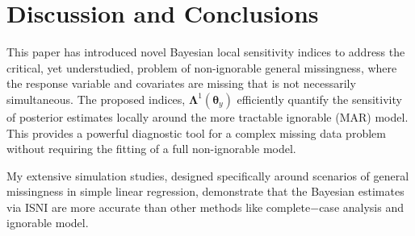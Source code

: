 \documentclass[twoside]{article}
\begin{document}
\section{Discussion  and Conclusions}
This paper has introduced novel Bayesian local sensitivity indices to address
the critical, yet understudied, problem of non-ignorable general missingness,
where the response variable and  covariates are missing that is not necessarily simultaneous.
 The proposed  indices, $\pmb\Lambda^{1}(\pmb\theta _y)$  efficiently quantify the sensitivity of posterior estimates locally around the more tractable ignorable (MAR) model. This provides a powerful diagnostic
tool for a complex missing data problem without requiring the fitting of a full
non-ignorable model.

My extensive simulation studies, designed specifically around scenarios of general
missingness in simple  linear regression, demonstrate that
the Bayesian estimates via ISNI are more accurate than other methods like complete$-$case analysis and ignorable model.
\end{document}
